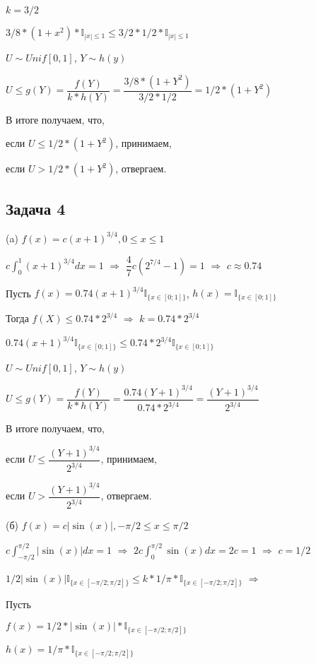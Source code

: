 \documentclass[a4paper,12pt]{article} %
\begin{document}
$k = 3/2$

$3/8 * (1+x^2) * \mathbb{I}_{ |x| \leq 1} \leq 3/2*1/2*\mathbb{I}_{ |x| \leq 1}$

$U\sim Unif[0,1]$, $Y\sim h(y)
$

$U\leq g(Y) =\dfrac{f(Y)}{k*h(Y)} = \dfrac{3/8 * (1+Y^2)  }{3/2*1/2} = 1/2* (1+Y^2)$


В итоге получаем, что,

если $U\leq 1/2*(1+Y^2) $,  принимаем, 

если $U > 1/2*(1+Y^2) $,  отвергаем.

\newpage


\subsection*{Задача 4}

(a) $f(x) = c (x+1)^{3/4}, 0\leq x\leq1$ 

$c \int_{0}^{1} (x+1)^{3/4} dx=1  $
$\Rightarrow$
$\dfrac{4}{7}c  (2^{7/4} -1)=1   $
$\Rightarrow$
$c\approx 0.74$

Пусть 
$f(x) = 0.74 (x+1)^{3/4}  \mathbb{I}_{\{x\in [0;1]\}} $, 
$h(x) = \mathbb{I}_{\{x\in [0;1]\}}  $ 
 
Тогда $f(X) \leq 0.74 * 2^{3/4}  $ $\Rightarrow$
$k = 0.74 * 2^{3/4} $ 


$0.74 (x+1)^{3/4}  \mathbb{I}_{\{x\in [0;1]\}} \leq   0.74 * 2^{3/4}  \mathbb{I}_{\{x\in [0;1]\}} $


$U\sim Unif[0,1]$,
$Y \sim h(y)$

$U\leq g(Y) =\dfrac{f(Y)}{k*h(Y)} = \dfrac{0.74 (Y+1)^{3/4} }{0.74*2^{3/4}} = \dfrac{(Y+1)^{3/4}}{2^{3/4}}$

В итоге получаем, что,

если $U\leq \dfrac{(Y+1)^{3/4}}{2^{3/4}} $,  принимаем,
 
если $U > \dfrac{(Y+1)^{3/4}}{2^{3/4}} $,  отвергаем.


(б)  $f(x) = c|\sin(x)|, -\pi/2 \leq x\leq \pi/2$
 
 $c\int_{-\pi/2}^{\pi/2} |\sin(x)| dx = 1 $
 $\Rightarrow$
$2c\int_{0}^{\pi/2} \sin(x) dx=2c = 1  $
$\Rightarrow$
$c=1/2$

$1/2 |\sin(x)| \mathbb{I}_{\{x\in [-\pi/2 ;\pi/2 ]\}} \leq k * 1/\pi * \mathbb{I}_{\{x\in [-\pi/2 ;\pi/2 ]\}} $ $\Rightarrow$


Пусть

$f(x) =  1/2*|\sin(x)| * \mathbb{I}_{\{x\in [-\pi/2 ;\pi/2 ]\}} $

$h(x) = 1/\pi * \mathbb{I}_{\{x\in [-\pi/2 ;\pi/2 ]\}}  $
\end{document}
